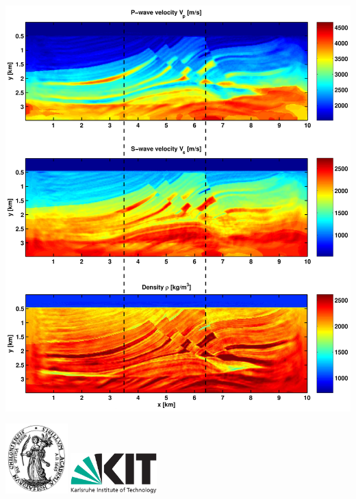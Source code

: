 \begin{center}
\begin{minipage}[t]{1.00\textwidth}
\begin{minipage}[h]{0.65\textwidth}
\includegraphics[width=\textwidth]{figures/DENISE_Marmousi1.png}

\end{minipage}
\par\endgroup
\end{minipage}
\end{center}

\vspace{0.5cm}

\begin{center}
\includegraphics[width=0.18\textwidth]{CAU_Siegel.png}
\hspace{2cm}
\includegraphics[width=0.25\textwidth]{Kitlogo_en_cmyk.pdf}
\end{center}
\rmfamily